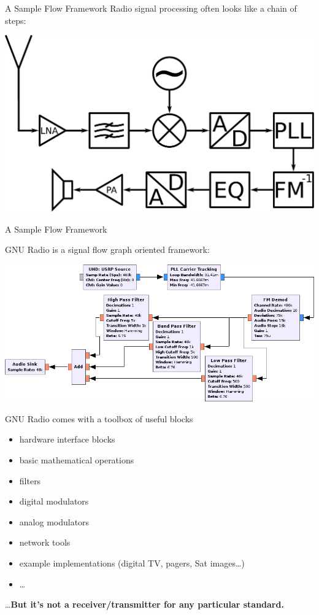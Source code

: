 \documentclass{beamer}
\begin{document}
\begin{frame}{A Sample Flow Framework}
  Radio signal processing often looks like a chain of steps:

  \vfill
  \includegraphics[width=\textwidth]{carrx.pdf}
\end{frame}
\begin{frame}{A Sample Flow Framework}

  GNU Radio is a signal flow graph oriented framework:

 \vfill
 \includegraphics[width=\textwidth]{carrxfg.png}

\end{frame}

\begin{frame}{GNU Radio comes with a toolbox of useful blocks}
\begin{itemize}
  \item hardware interface blocks
  \item basic mathematical operations
  \item filters
  \item digital modulators
  \item analog modulators
  \item network tools
  \item example implementations (digital TV, pagers, Sat images\ldots)
  \item \dots
\end{itemize}

\dots \textbf{But it's not a receiver/transmitter for any particular standard.}
\end{frame}
\end{document}
